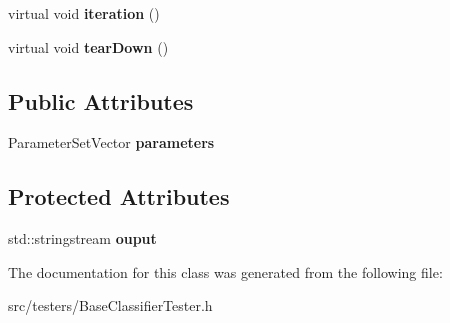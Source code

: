 \begin{DoxyCompactItemize}
\item 
\hypertarget{classffactory_1_1_base_classifier_tester_a8533abb37e38740e840064a22fb50a81}{virtual void {\bfseries iteration} ()}\label{classffactory_1_1_base_classifier_tester_a8533abb37e38740e840064a22fb50a81}

\item 
\hypertarget{classffactory_1_1_base_classifier_tester_a1d4e0885227b630d713d45bfb4388f1d}{virtual void {\bfseries tear\-Down} ()}\label{classffactory_1_1_base_classifier_tester_a1d4e0885227b630d713d45bfb4388f1d}

\end{DoxyCompactItemize}
\subsection*{Public Attributes}
\begin{DoxyCompactItemize}
\item 
\hypertarget{classffactory_1_1_base_classifier_tester_aa34c3f1803b71f8dbd932c74b37972ba}{Parameter\-Set\-Vector {\bfseries parameters}}\label{classffactory_1_1_base_classifier_tester_aa34c3f1803b71f8dbd932c74b37972ba}

\end{DoxyCompactItemize}
\subsection*{Protected Attributes}
\begin{DoxyCompactItemize}
\item 
\hypertarget{classffactory_1_1_base_classifier_tester_ac26b1322395902c088faceefe5c779c3}{std\-::stringstream {\bfseries ouput}}\label{classffactory_1_1_base_classifier_tester_ac26b1322395902c088faceefe5c779c3}

\end{DoxyCompactItemize}


The documentation for this class was generated from the following file\-:\begin{DoxyCompactItemize}
\item 
src/testers/Base\-Classifier\-Tester.\-h\end{DoxyCompactItemize}
